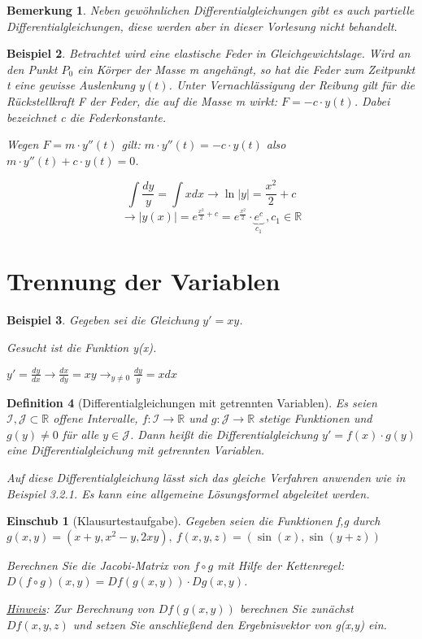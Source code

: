 \documentclass[12pt,a4paper]{scrreprt}
\newtheorem{defi}{Definition}[section]
\newtheorem{bemerkung}[defi]{Bemerkung}
\newtheorem{beispiel}[defi]{Beispiel}
\newtheorem*{einschub}{Einschub}
\begin{document}
	\begin{bemerkung}
		Neben gewöhnlichen Differentialgleichungen gibt es auch partielle Differentialgleichungen, diese werden aber in dieser Vorlesung nicht behandelt.
	\end{bemerkung}

	\begin{beispiel}
		Betrachtet wird eine elastische Feder in Gleichgewichtslage. Wird an den Punkt $P_0$ ein Körper der Masse m angehängt, so hat die Feder zum Zeitpunkt t eine gewisse Auslenkung $y(t)$. Unter Vernachlässigung der Reibung gilt für die Rückstellkraft F der Feder, die auf die Masse m wirkt: $F=-c \cdot y(t)$. Dabei bezeichnet c die Federkonstante.

		Wegen $F=m \cdot y''(t)$ gilt: $m \cdot y''(t)=-c \cdot y(t)$ also $m \cdot y''(t) + c \cdot y(t) = 0$.

		\[\int\frac{dy}{y}=\int xdx \to \ln\left|y\right| = \frac{x^2}{2}+c \]
		\[\to |y(x)| = e^{\frac{x^2}{2}+c}=e^{\frac{x^2}{2}}\cdot \underbrace{e^c}_{c_1}\ ,c_1\in\mathbb{R}\]
	\end{beispiel}

	\section{Trennung der Variablen}
	\begin{beispiel}
		Gegeben sei die Gleichung $y'=xy$.

		Gesucht ist die Funktion y(x).

		$y'=\frac{dy}{dx} \to \frac{dx}{dy}=xy \to_{y \ne 0} \frac{dy}{y}=xdx$
	\end{beispiel}

	\begin{defi}[Differentialgleichungen mit getrennten Variablen]
		Es seien $\mathcal{I},\mathcal{J}\subset\mathbb{R}$ offene Intervalle, $f:\mathcal{I}\to\mathbb{R}$ und $g:\mathcal{J}\to\mathbb{R}$ stetige Funktionen und $g(y)\ne0$ für alle $y\in\mathcal{J}$. Dann heißt die Differentialgleichung $y'=f(x)\cdot g(y)$ eine Differentialgleichung mit getrennten Variablen.

		Auf diese Differentialgleichung lässt sich das gleiche Verfahren anwenden wie in Beispiel 3.2.1. Es kann eine allgemeine Lösungsformel abgeleitet werden.
	\end{defi}

	\begin{einschub}[Klausurtestaufgabe]
		Gegeben seien die Funktionen f,g durch $g(x,y)=(x+y,x^2-y,2xy),\ f(x,y,z)=(\sin(x),\sin(y+z))$

		Berechnen Sie die Jacobi-Matrix von $f\circ g$ mit Hilfe der Kettenregel: $D(f\circ g)(x,y)=Df(g(x,y))\cdot Dg(x,y)$.

		\underline{Hinweis}: Zur Berechnung von $Df(g(x,y))$ berechnen Sie zunächst $Df(x,y,z)$ und setzen Sie anschließend den Ergebnisvektor von g(x,y) ein.
	\end{einschub}
\end{document}
